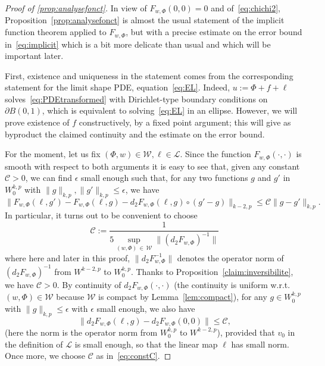 \documentclass[10pt]{amsart}
\theoremstyle{definition}\newtheorem{defi}[theo]{Definition}\newtheorem{rema}[theo]{Remark}\newtheorem{exam}[theo]{Example}\newtheorem{exem}[theo]{Example}\newtheorem{nota}[theo]{Notation}
\newcommand{\clL}{\mathcal{L}}
\newcommand{\clW}{\mathcal{W}}
\newcommand{\clC}{\mathcal{C}}
\newcommand{\norm}[1]{\lVert #1 \rVert}
\newcommand{\eps}{\epsilon}
\begin{document}
\begin{proof}[Proof of \cref{prop:analysefonct}]
In view of $F_{w,\Phi}(0,0)=0$ and of~\eqref{eq:chichi2},
Proposition~\ref{prop:analysefonct} is almost the usual statement of the implicit function theorem applied to $F_{w,\Phi}$, but with a precise estimate on the error bound in~\eqref{eq:implicit} which is a bit more delicate than usual and which will be important later.

First, existence and uniqueness in the statement comes from the corresponding statement for the limit shape PDE, equation~\eqref{eq:EL}. Indeed, $u:=\Phi + f+\ell$ solves~\eqref{eq:PDEtransformed} with Dirichlet-type boundary conditions on $\partial B(0,1)$, which is equivalent to solving~\eqref{eq:EL} in an ellipse. However, we will prove existence of $f$ constructively, by a fixed point argument; this will give as byproduct the claimed continuity and the estimate on the error bound.

For the moment, let us fix $(\Phi, w)\in\clW, \ell\in\clL$. Since the function $F_{w,\Phi}(\cdot, \cdot)$ is smooth with respect to both arguments it is easy to see that, given any constant $\clC>0$, we can find $\eps$ small enough such that, for any two functions $g$ and $g'$ in $W^{k,p}_0$ with $\norm{g}_{k,p},\norm{g'}_{k,p} \leq \eps$, we have
\begin{equation}\label{eq:boundDLF}
\big\|F_{w,\Phi}(\ell, g') - F_{w,\Phi}(\ell, g) - d_2 F_{w,\Phi}(\ell, g) \circ (g' - g) \big\|_{{k-2, p}} \leq \clC\norm{g - g'}_{{k, p}}.
\end{equation}
In particular, it turns out to be convenient to choose
\begin{equation}\label{eq:constC}
\clC:=\frac{1}{5 \sup_{(w,\Phi)\,\in\,\clW}\norm{(d_2 F_{w,\Phi})^{-1}}}
\end{equation}
where here and later in this proof, $\norm{d_2 F_{w,\Phi}^{-1}}$ denotes the operator norm of $(d_2 F_{w,\Phi})^{-1}$ from $W^{k-2,p}$ to $W^{k,p}_0$. Thanks to Proposition~\ref{claim:inversibilite}, we have $\clC>0$. By continuity of $d_2 F_{w,\Phi}(\cdot,\cdot)$ (the continuity is uniform w.r.t. $(w,\Phi)\in\clW$ because $\clW$ is compact by Lemma~\ref{lem:compact}), for any $g\in W^{k,p}_0$ with $\norm{g}_{k,p} \leq \eps$ with $\eps$ small enough, we also have
\begin{equation}\label{eq:bounddF-1}
\big\|d_2 F_{w,\Phi}(\ell,g) - d_2 F_{w,\Phi}(0,0)\big\|
\leq \clC,
\end{equation}
(here the norm is the operator norm from $W^{k,p}_0$ to $W^{k-2,p}$), provided that $v_0$ in the definition of $\clL$ is small enough, so that the linear map $\ell$ has small norm. Once more, we choose $\clC$ as in~\eqref{eq:constC}.


\end{proof}
\end{document}
